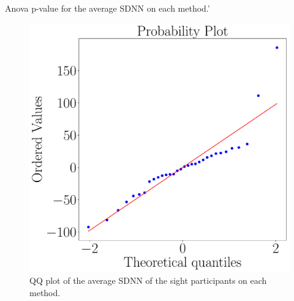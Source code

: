 \begin{table}[!htb]
    \caption{Anova p-value for the average SDNN on each method.'}
    \label{tab:blocanova_sdnn_two_way_blind_sight}
\begin{minipage}{0.45\textwidth}
    
\end{minipage}
\begin{minipage}{0.45\textwidth}
    
\end{minipage}
\end{table}

\begin{figure}[!htb]
    \centering
    \begin{minipage}{0.45\textwidth}
        \centering
        \includegraphics[width = \textwidth]{Resultados/ECG/Figuras/pdf/qqplot_sdnn_two_way_sight.pdf}
        \caption{QQ plot of the average SDNN of the sight participants on each method.}
        \label{fig:qqplot_sdnn_two_way_sight}
    \end{minipage}
    \begin{minipage}{0.075\textwidth}
        \hfill
    \end{minipage}
    \begin{minipage}{0.45\textwidth}

\end{minipage}
\end{figure}
